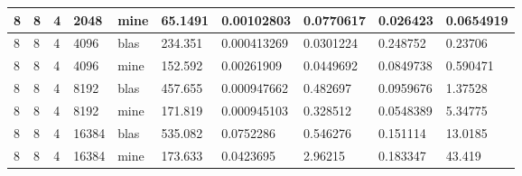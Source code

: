 \documentclass{article}
\begin{document}
\begin{table}[]
{\begin{tabular}{|l|l|l|l|l|l|l|l|l|l|}
8       & 8         & 4     & 2048  & mine & 65.1491 & 0.00102803  & 0.0770617  & 0.026423    & 0.0654919 \\ \hline
8       & 8         & 4     & 4096  & blas & 234.351 & 0.000413269 & 0.0301224  & 0.248752    & 0.23706   \\ \hline
8       & 8         & 4     & 4096  & mine & 152.592 & 0.00261909  & 0.0449692  & 0.0849738   & 0.590471  \\ \hline
8       & 8         & 4     & 8192  & blas & 457.655 & 0.000947662 & 0.482697   & 0.0959676   & 1.37528   \\ \hline
8       & 8         & 4     & 8192  & mine & 171.819 & 0.000945103 & 0.328512   & 0.0548389   & 5.34775   \\ \hline
8       & 8         & 4     & 16384 & blas & 535.082 & 0.0752286   & 0.546276   & 0.151114    & 13.0185   \\ \hline
8       & 8         & 4     & 16384 & mine & 173.633 & 0.0423695   & 2.96215    & 0.183347    & 43.419    \\ \hline
\end{tabular}%
}
\end{table}
\end{document}
